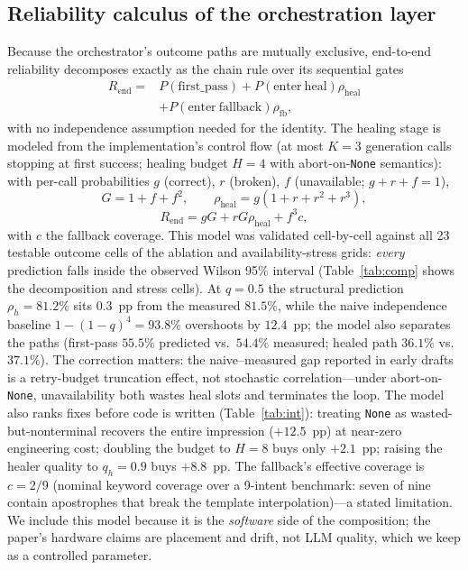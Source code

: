 \documentclass[journal,10pt,twocolumn]{IEEEtran}
\begin{document}
\subsection{Reliability calculus of the orchestration layer}
\label{sec:calculus}
Because the orchestrator's outcome paths are mutually exclusive, end-to-end reliability decomposes exactly as the
chain rule over its sequential gates
\begin{equation}\begin{split}
R_{\mathrm{end}}={}&P(\mathrm{first\_pass})+P(\mathrm{enter\ heal})\rho_{\mathrm{heal}}\\
&+P(\mathrm{enter\ fallback})\rho_{\mathrm{fb}},
\end{split}\label{eq:composition}
\end{equation}
with no independence assumption needed for the identity. The healing stage is modeled from the implementation's
control flow (at most $K{=}3$ generation calls stopping at first success; healing budget $H{=}4$ with
abort-on-\texttt{None} semantics): with per-call probabilities $g$ (correct), $r$ (broken), $f$ (unavailable;
$g{+}r{+}f{=}1$),
\begin{equation}
G=1+f+f^{2},\qquad \rho_{\mathrm{heal}}=g(1+r+r^{2}+r^{3}),
\label{eq:gamel}
\end{equation}
\begin{equation}
R_{\mathrm{end}}=gG+rG\rho_{\mathrm{heal}}+f^{3}c,
\label{eq:rheal}
\end{equation}
with $c$ the fallback coverage. This model was validated cell-by-cell against all 23 testable outcome cells of the
ablation and availability-stress grids: \emph{every} prediction falls inside the observed Wilson 95\% interval
(Table~\ref{tab:comp} shows the decomposition and stress cells). At $q{=}0.5$ the structural prediction
$\rho_h{=}81.2\%$ sits $0.3$~pp from the measured $81.5\%$, while the naive independence baseline
$1-(1-q)^{4}{=}93.8\%$ overshoots by $12.4$~pp; the model also separates the paths (first-pass $55.5\%$
predicted vs.\ $54.4\%$ measured; healed path $36.1\%$ vs.\ $37.1\%$). The correction matters: the
naive--measured gap reported in early drafts is a retry-budget truncation effect, not stochastic
correlation---under abort-on-\texttt{None}, unavailability both wastes heal slots and terminates the loop.
The model also ranks fixes before code is written (Table~\ref{tab:int}): treating \texttt{None} as
wasted-but-nonterminal recovers the entire impression ($+12.5$~pp) at near-zero engineering cost; doubling the
budget to $H{=}8$ buys only $+2.1$~pp; raising the healer quality to $q_h{=}0.9$ buys $+8.8$~pp. The fallback's
effective coverage is $c{=}2/9$ (nominal keyword coverage over a 9-intent benchmark: seven of nine contain
apostrophes that break the template interpolation)---a stated limitation. We include this model because it is the
\emph{software} side of the composition; the paper's hardware claims are placement and drift, not LLM quality,
which we keep as a controlled parameter.
\end{document}
